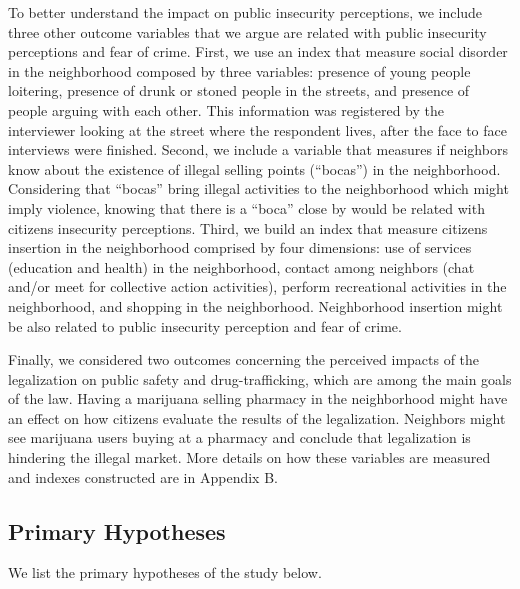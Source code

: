 \documentclass[11pt]{article}
\begin{document}
To better understand the impact on public insecurity perceptions, we include three other outcome variables that we argue are related with public insecurity perceptions and fear of crime. First, we use an index that measure social disorder in the neighborhood composed by three variables: presence of young people loitering, presence of drunk or stoned people in the streets, and presence of people arguing with each other. This information was registered by the interviewer looking at the street where the respondent lives, after the face to face interviews were finished. Second, we include a variable that measures if neighbors know about the existence of illegal selling points (``bocas'') in the neighborhood. Considering that ``bocas'' bring illegal activities to the neighborhood which might imply violence, knowing that there is a ``boca'' close by  would be related with citizens insecurity perceptions. Third, we build an index that measure citizens insertion in the neighborhood comprised by four dimensions: use of services (education and health) in the neighborhood, contact among neighbors (chat and/or meet for collective action activities), perform recreational activities in the neighborhood, and shopping in the neighborhood. Neighborhood insertion might be also related to public insecurity perception and fear of crime.

Finally, we considered two outcomes concerning the perceived impacts of the legalization on public safety and drug-trafficking, which are among the main goals of the law. Having a marijuana selling pharmacy in the neighborhood might have an effect on how citizens evaluate the results of the legalization. Neighbors might see marijuana users buying at a pharmacy and conclude that legalization is hindering the illegal market. More details on how these variables are measured and indexes constructed are in Appendix B.

\subsection{Primary Hypotheses}
We list the primary hypotheses of the study below.
\end{document}
